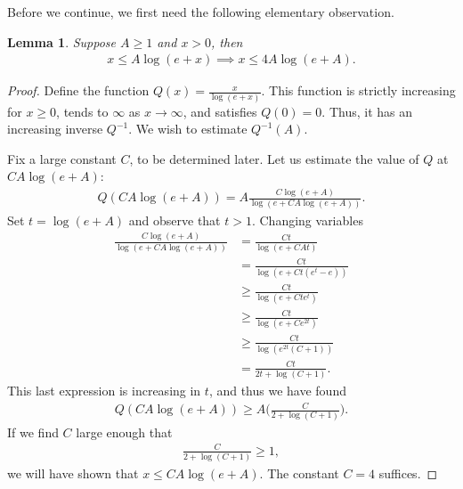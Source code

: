 \documentclass[oneside]{amsart}
\newtheorem{lemma}[theorem]{Lemma}
\theoremstyle{definition}
\theoremstyle{plain}
\numberwithin{equation}{section}
\numberwithin{theorem}{section}
\begin{document}
Before we continue, we first need the following elementary observation.
\begin{lemma} \label{inverse}
  Suppose $A \geq 1$ and $x > 0$, then
  \begin{align*}
    x \leq A \log(e+x) \implies x \leq 4A \log(e+A).
  \end{align*}
\end{lemma}
\begin{proof}
  Define the function $Q(x) = \frac{x}{\log(e+x)}$.
  This function is strictly increasing for $x \geq 0$, tends to $\infty$ as
  $x \to \infty$, and satisfies $Q(0) = 0$.
  Thus, it has an increasing inverse $Q^{-1}$.
  We wish to estimate $Q^{-1}(A)$.

  Fix a large constant $C$, to be determined later.
  Let us estimate the value of $Q$ at $C A\log(e+A)$:
  \begin{align*}
    Q(CA\log(e+A)) = A \frac{C\log(e+A)}{\log(e+CA\log(e+A))}.
  \end{align*}
  Set $t = \log(e+A)$ and observe that $t > 1$. Changing variables
  \begin{align*}
    \frac{C\log(e+A)}{\log(e+CA\log(e+A))} &= \frac{Ct}{\log(e+CAt)} \\
    &= \frac{Ct}{\log(e+Ct(e^t-e))} \\
    &\geq \frac{Ct}{\log(e+Ct e^t)} \\
    &\geq \frac{Ct}{\log(e+Ce^{2t})} \\
    &\geq \frac{Ct}{\log(e^{2t}(C+1))} \\
    &= \frac{Ct}{2t + \log(C+1)}.
  \end{align*}
  This last expression is increasing in $t$, and thus we have found
  \begin{align*}
    Q(CA\log(e+A)) \geq A \bigg( \frac{C}{2+\log(C+1)}\bigg).
  \end{align*}
  If we find $C$ large enough that
  \begin{align*}
    \frac{C}{2+\log(C+1)} \geq 1,
  \end{align*}
  we will have shown that $x \leq CA\log(e+A)$. The constant $C=4$ suffices.
\end{proof}
\end{document}
